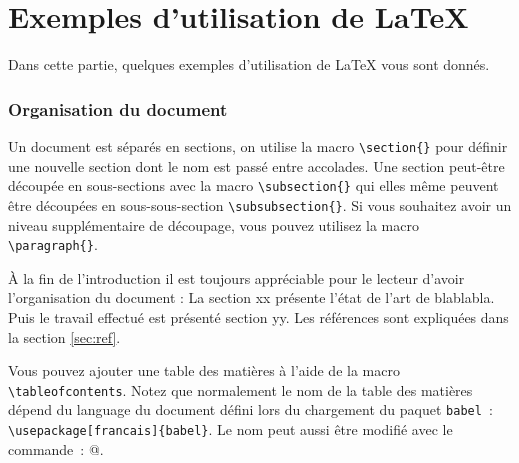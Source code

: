 \documentclass{rapport}
\def\Latex{\LaTeX\xspace}
\begin{document}
  
  \pageblanche
  \part{Exemples d'utilisation de \Latex}
  
    Dans cette partie, quelques exemples d'utilisation de \Latex vous sont donnés.

    \section{Organisation du document}
      
      Un document est séparés en sections, on utilise la macro \verb"\section{}" pour définir une nouvelle section dont le nom est passé entre accolades. Une section peut-être découpée en sous-sections avec la macro \verb+\subsection{}+ qui elles même peuvent être découpées en sous-sous-section \verb-\subsubsection{}-. Si vous souhaitez avoir un niveau supplémentaire de découpage, vous pouvez utilisez la macro \verb!\paragraph{}!.
      
      À la fin de l'introduction il est toujours appréciable pour le lecteur d'avoir l'organisation du document : La section xx présente l'état de l'art de blablabla. Puis le travail effectué est présenté section yy. Les références sont expliquées dans la section \ref{sec:ref}.
      
      Vous pouvez ajouter une table des matières à l'aide de la macro \verb#\tableofcontents#. Notez que normalement le nom de la table des matières dépend du language du document défini lors du chargement du paquet \verb'babel'~: \verb&\usepackage[francais]{babel}&. Le nom peut aussi être modifié avec le commande~: \verb@\renewcommand\contentsname{Nouveau nom}@.
      
\end{document}

